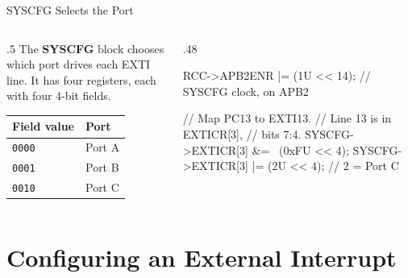 \documentclass[9pt,aspectratio=169,xcolor=table]{beamer}
\begin{document}
\begin{frame}[fragile]{SYSCFG Selects the Port}
    \begin{columns}[T]
    \begin{column}{.5\textwidth}
        The \textbf{SYSCFG} block chooses which port drives each EXTI line. It has four registers, each with four 4-bit fields.

        \vspace{3mm}
        \begin{center}
        {\small
        \striped
        \begin{tabular}{@{}l l@{}}
            \toprule
            \textbf{Field value} & \textbf{Port} \\
            \midrule
            \texttt{0000} & Port A \\
            \texttt{0001} & Port B \\
            \texttt{0010} & Port C \\
            \bottomrule
        \end{tabular}}
        \end{center}
    \end{column}
    \begin{column}{.48\textwidth}
\begin{cc}[basicstyle=\ttfamily\scriptsize]
RCC->APB2ENR |= (1U << 14);
    // SYSCFG clock, on APB2

// Map PC13 to EXTI13.
// Line 13 is in EXTICR[3],
// bits 7:4.
SYSCFG->EXTICR[3] &= ~(0xFU << 4);
SYSCFG->EXTICR[3] |=  (2U << 4);
    // 2 = Port C
\end{cc}
    \end{column}
    \end{columns}
\end{frame}


\section{Configuring an External Interrupt}
\end{document}

